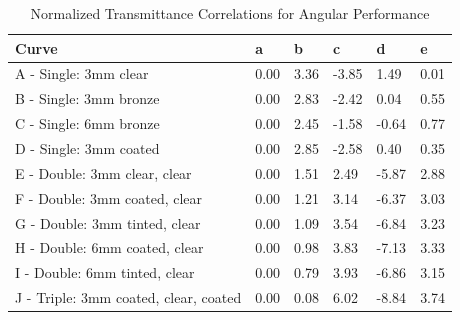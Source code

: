 \begin{table}[tbp]
  \caption{Normalized Transmittance Correlations for Angular Performance}
  \label{tab:normalized-transmittance-correlations-for}
  \centering
  \begin{tabular}{llllll}
  \hline
  Curve                                 & a    & b    & c     & d     & e    \\ \hline
  A - Single: 3mm clear                 & 0.00 & 3.36 & -3.85 & 1.49  & 0.01 \\
  B - Single: 3mm bronze                & 0.00 & 2.83 & -2.42 & 0.04  & 0.55 \\
  C - Single: 6mm bronze                & 0.00 & 2.45 & -1.58 & -0.64 & 0.77 \\
  D - Single: 3mm coated                & 0.00 & 2.85 & -2.58 & 0.40  & 0.35 \\
  E - Double: 3mm clear, clear          & 0.00 & 1.51 & 2.49  & -5.87 & 2.88 \\
  F - Double: 3mm coated, clear         & 0.00 & 1.21 & 3.14  & -6.37 & 3.03 \\
  G - Double: 3mm tinted, clear         & 0.00 & 1.09 & 3.54  & -6.84 & 3.23 \\
  H - Double: 6mm coated, clear         & 0.00 & 0.98 & 3.83  & -7.13 & 3.33 \\
  I - Double: 6mm tinted, clear         & 0.00 & 0.79 & 3.93  & -6.86 & 3.15 \\
  J - Triple: 3mm coated, clear, coated & 0.00 & 0.08 & 6.02  & -8.84 & 3.74
  \end{tabular}
\end{table}

